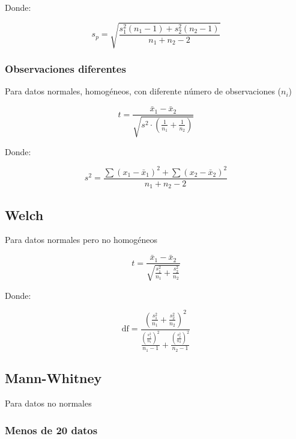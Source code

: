 \documentclass{AsignaturaResumen}
\begin{document}
Donde:

\begin{equation*}
    s_{p} = \sqrt{\frac{s_{1}^{2} (n_{1}-1) + s_{2}^{2} (n_{2}-1)}{n_{1} + n_{2} - 2}}
\end{equation*}


\subsubsection{Observaciones diferentes}

Para datos normales, homogéneos, con diferente número de observaciones ($n_{i}$)

\begin{equation*}
    t = \frac{\bar{x}_{1} - \bar{x}_{2}}{\sqrt{s^{2} \cdot (\frac{1}{n_{1}} + \frac{1}{n_{2}})}}
\end{equation*}

Donde:

\begin{equation*}
    s^{2} = \frac{\sum{(x_{1} - \bar{x}_{1})^{2}} + \sum{(x_{2} - \bar{x}_{2})^{2}}}{n_{1} + n_{2} - 2}
\end{equation*}


\subsection{Welch}

Para datos normales pero no homogéneos

\begin{equation*}
    t = \frac{\bar{x}_{1} - \bar{x}_{2}}{\sqrt{\frac{s_{1}^{2}}{n_{1}} + \frac{s_{2}^{2}}{n_{2}}}}
\end{equation*}

Donde:

\begin{equation*}
    \mathrm{df} = \frac{ (\frac{s_{1}^{2}}{n_{1}} + \frac{s_{2}^{2}}{n_{2}})^{2} }{ \frac{\left( \frac{s_{1}^{2}}{n_{1}} \right)^{2}}{n_{1}-1}  + \frac{\left(\frac{s_{2}^{2}}{n_{2}} \right)^{2}}{n_{2}-1} }
\end{equation*}


\subsection{Mann-Whitney}

Para datos no normales

\subsubsection{Menos de 20 datos}
\end{document}
